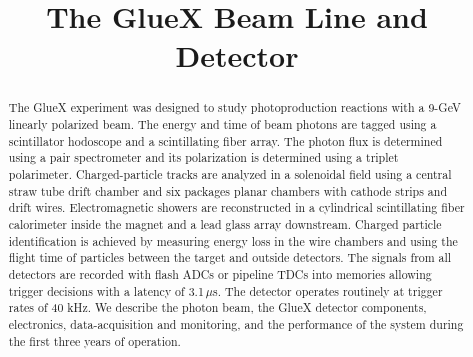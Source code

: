 \documentclass{elsarticle}
\begin{document}
  


  
\begin{frontmatter} 


\title{The GlueX Beam Line and Detector}





\begin{abstract}
The GlueX experiment was designed to study photoproduction reactions with a 9-GeV linearly polarized beam. The energy and time of beam photons are tagged using a scintillator
hodoscope and a scintillating fiber array. The photon flux is determined using a pair spectrometer and its polarization is determined using a triplet polarimeter. 
Charged-particle tracks are analyzed in a solenoidal field using a central straw tube
drift chamber and six packages planar chambers with cathode strips and drift wires. Electromagnetic showers are reconstructed in a cylindrical scintillating fiber calorimeter inside the magnet and
a lead glass array downstream. Charged particle identification is achieved by measuring energy loss in the wire chambers and using the flight time of particles between the target and outside 
detectors. The signals from all detectors are recorded with flash ADCs or pipeline TDCs into memories allowing trigger decisions with a latency of 3.1\,$\mu$s. The detector operates routinely at
trigger rates of 40 kHz. We describe the photon beam, the GlueX detector components, electronics, data-acquisition and monitoring, and the performance of the system during the first three 
years of operation.
\end{abstract}   


\end{frontmatter}

  
   

\end{document}
